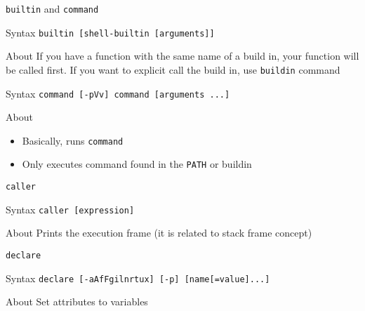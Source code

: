 \documentclass[10pt, compress, aspectratio=169]{beamer}
\begin{document}
\begin{frame}{\texttt{builtin} and \texttt{command}}
  \begin{alertblock}{Syntax}
    \texttt{builtin [shell-builtin [arguments]]}
  \end{alertblock}

  \begin{exampleblock}{About}
    If you have a function with the same name of a build in, your
    function will be called first. If you want to explicit call the build in,
    use \texttt{buildin} command
  \end{exampleblock}

  \begin{alertblock}{Syntax}
    \texttt{command [-pVv] command [arguments ...]}
  \end{alertblock}

  \begin{exampleblock}{About}
    \begin{itemize}
      \item Basically, runs \texttt{command}
      \item Only executes command found in the \texttt{PATH} or buildin
    \end{itemize}
  \end{exampleblock}
\end{frame}

\begin{frame}{\texttt{caller}}
  \begin{alertblock}{Syntax}
    \texttt{caller [expression]}
  \end{alertblock}

  \begin{exampleblock}{About}
    Prints the execution frame (it is related to stack frame concept)
  \end{exampleblock}

  
\end{frame}

\begin{frame}{\texttt{declare}}
  \begin{alertblock}{Syntax}
    \texttt{declare [-aAfFgilnrtux] [-p] [name[=value]...]}
  \end{alertblock}

  \begin{exampleblock}{About}
    Set attributes to variables
  \end{exampleblock}
\end{frame}
\end{document}
